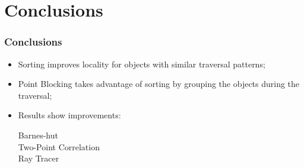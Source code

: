 \section{Conclusions}
\begin{frame}
	\frametitle{Conclusions}
	\begin{itemize}
		\item Sorting improves locality for objects with similar traversal patterns;

		\item Point Blocking takes advantage of sorting by grouping the objects during the traversal;

		\item Results show improvements:
		\begin{description}
			\item[Barnes-hut]
			\item[Two-Point Correlation]
			\item[Ray Tracer]
		\end{description}
	\end{itemize}
\end{frame}